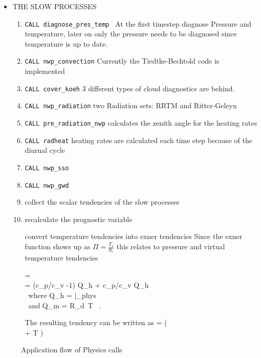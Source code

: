 \begin{itemize}
\item  THE SLOW PROCESSES
\begin{enumerate}
\item \texttt{CALL diagnose\_pres\_temp }
At the first timestep diagnose Pressure and temperature, later on only the pressure needs to be diagnosed since temperature is up to date.
\item \texttt{CALL nwp\_convection} Currently the Tiedtke-Bechtold code is implemented
\item \texttt{CALL cover\_koeh} 3 different types of cloud diagnostics are behind.
\item \texttt{CALL nwp\_radiation} two Radiation sets: RRTM and Ritter-Geleyn
\item \texttt{CALL pre\_radiation\_nwp} calculates the zenith angle for the heating rates
\item \texttt{CALL radheat} heating rates are calculated each time step because of the diurnal cycle
\item \texttt{CALL nwp\_sso}
\item \texttt{CALL nwp\_gwd}

\item collect the scalar tendencies of the slow processes

\item recalculate the prognostic variable

 convert temperature tendencies into exner tendencies
 Since the exner function shows up as $\Pi=\frac{T_v}{\theta_v}$ this relates
 to pressure and virtual temperature tendencies

\bea
  =  \,  \\
  = (c_p/c_v -1) Q_h + c_p/c_v Q_h\\
  \mbox{ where}\;  Q_h =  |_{phys} \\
  \mbox{ and}\; Q_m = R_d \,T \,\rho {} .
\eea

The resulting tendency can be written as
\be
 =  \left(  \\
                        + T  \right) 
\ee

\end{enumerate}


\end{itemize}

\begin{figure}
\begin{center}
\end{center}
\caption{Application flow of Physics calls}
\label{flux}
\end{figure}
